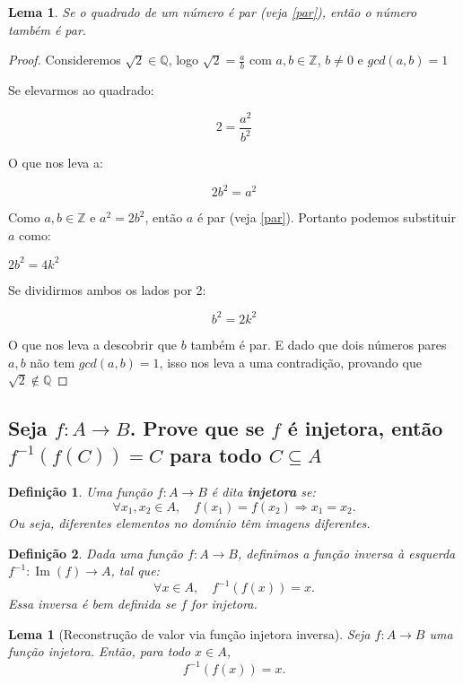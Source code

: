 \documentclass{article}
\newtheorem{definition}{Definição}
\newtheorem{lemma}[theorem]{Lema}
\begin{document}
\begin{lemma}
\label{lemma:Lema1}
Se o quadrado de um número é par (veja \ref{par}), então o número também é par.
\end{lemma} 

\begin{proof}
    Consideremos $\sqrt{2} \in \mathbb{Q}$, logo $\sqrt{2} = \frac{a}{b}$ com $a, b \in \mathbb{Z}$, $b\neq 0$ e $gcd(a, b) = 1$

    Se elevarmos ao quadrado:

    $$2 = \frac{a^2}{b^2}$$

    O que nos leva a:

    $$2b^2 = a^2$$

    Como $a,b \in \mathbb{Z}$ e $a^2 = 2b^2 $, então $a$ é par (veja \ref{par}). Portanto podemos substituir $a$ como:

    $2b^2 = 4k^2$

    Se dividirmos ambos os lados por 2:

    $$b^2 = 2k^2$$

    O que nos leva a descobrir que $b$ também é par. E dado que dois números pares $a,b$ não tem $gcd(a,b) = 1$, isso nos leva a uma contradição, provando que $\sqrt{2} \notin \mathbb{Q}$

\end{proof}

\subsection{Seja $f: A \to B$. Prove que se $f$ é injetora, então $f^{-1}(f(C)) = C$ para todo $C \subseteq A$}

\begin{definition}
    Uma função \( f: A \to B \) é dita \textbf{injetora} se:
    \[
        \forall x_1, x_2 \in A, \quad f(x_1) = f(x_2) \Rightarrow x_1 = x_2.
    \]
    Ou seja, diferentes elementos no domínio têm imagens diferentes.
\end{definition}

\begin{definition}
    Dada uma função \( f: A \to B \), definimos a função inversa à esquerda \( f^{-1}: \operatorname{Im}(f) \to A \), tal que:
    \[
        \forall x \in A, \quad f^{-1}(f(x)) = x.
    \]
    Essa inversa é bem definida se \( f \) for injetora.
\end{definition}

\begin{lemma} [Reconstrução de valor via função injetora inversa]
    \label{func inj}
    Seja \( f: A \to B \) uma função injetora. Então, para todo \( x \in A \),
    \[
    f^{-1}(f(x)) = x.
    \]
\end{lemma}
\end{document}
